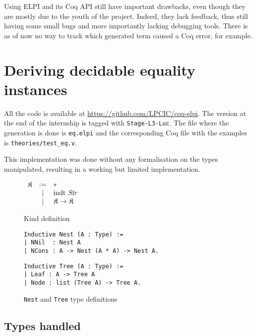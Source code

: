 \documentclass{article}
\newcommand{\K}{\mathfrak{K}}
\begin{document}
Using ELPI and its Coq API still have important drawbacks, even though they are
mostly due to the youth of the project. Indeed, they lack feedback, thus still
having some small bugs and more importantly lacking debugging tools. There is
as of now no way to track which generated term caused a Coq error, for example.

\section{Deriving decidable equality instances}\label{deceq}

All the code is available at \url{https://github.com/LPCIC/coq-elpi}. The version
at the end of the internship is tagged with \texttt{Stage-L3-Luc}. The file
where the generation is done is \texttt{eq.elpi} and the corresponding Coq file
with the examples is \texttt{theories/test\_eq.v}.

This implementation was done without any formalisation on the types manipulated,
resulting in a working but limited implementation.

\begin{figure}
    \begin{center}$\begin{array}{rcl}
        \K & := & * \\
           & |  & \text{indt \emph{Str}} \\
           & |  & \K\rightarrow\K \\
    \end{array}$\end{center}
    \caption{Kind definition}
    \label{kinds}
\end{figure}

\begin{figure}
    \begin{verbatim}
Inductive Nest (A : Type) :=
| NNil  : Nest A
| NCons : A -> Nest (A * A) -> Nest A.
    \end{verbatim} 

    \begin{verbatim}
Inductive Tree (A : Type) :=
| Leaf : A -> Tree A
| Node : list (Tree A) -> Tree A.
    \end{verbatim}
    \caption{\texttt{Nest} and \texttt{Tree} type definitions}
    \label{types}
\end{figure}

\newpage
\subsection{Types handled}
\end{document}
